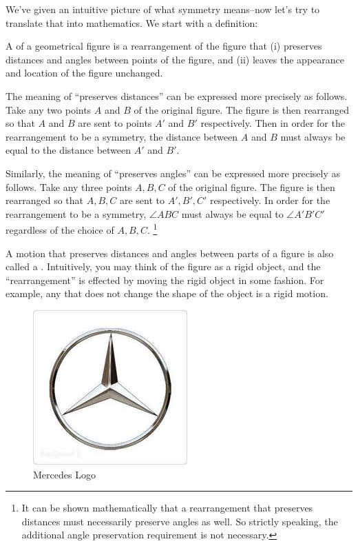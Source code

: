 We've given an intuitive picture of what symmetry means--now let's try to translate that into mathematics. We start with a definition:

\begin{defn}\label{symmDef} A  of a geometrical figure is a rearrangement of the figure that (i) preserves distances and angles between points of the figure,
 and (ii) leaves the appearance and location of the figure unchanged.
\end{defn}

\begin{rem}
The meaning  of ``preserves distances'' can be expressed more precisely as follows. Take any two points $A$ and $B$ of the original figure. The figure is then rearranged so that $A$ and $B$ are sent to points $A'$ and $B'$ respectively. Then in order for the rearrangement to be  a symmetry, the distance between $A$ and $B$ must always be equal to the distance between $A'$ and $B'$.

Similarly, the meaning of  ``preserves angles'' can be expressed more precisely as follows. Take any three points $A, B, C$ of the original figure. The figure is then rearranged so that $A, B, C$ are sent to $A', B', C'$ respectively. In order for the rearrangement to be  a symmetry, $\angle ABC$ must always be equal to $\angle A'B'C'$ regardless of the choice of $A, B, C$.
\footnote{It can be shown mathematically that a rearrangement that preserves distances must necessarily preserve angles as well. So strictly speaking, the additional  angle preservation  requirement is not necessary.}
\end{rem}

A motion that preserves distances and angles between parts of a figure is also called a . Intuitively, you may think of the figure as a rigid object, and the ``rearrangement'' is effected by moving the rigid object in some fashion.  For example, any   that does not change the shape of the object is a rigid motion.

\begin{figure}[ht]
\begin{center}
\includegraphics[scale=0.35]{images/mercedes.jpg}
\caption{Mercedes Logo}\label{mercedes}
\end{center}
\end{figure}

